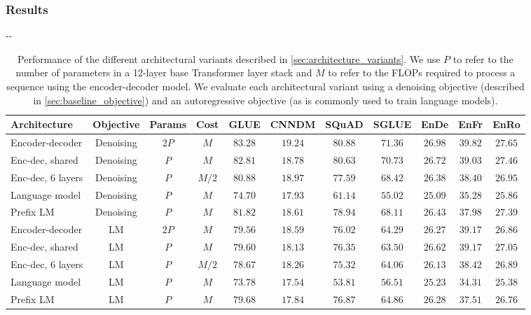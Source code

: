 \documentclass[twoside,11pt]{article}
\newlength{\offsetpage}
\newenvironment{widepage}{\begin{adjustwidth}{-\offsetpage}{-\offsetpage}
    \addtolength{\textwidth}{2\offsetpage}}
{\end{adjustwidth}}
\newcommand{\bsl}{\makebox[0pt][r]{\raisebox{0.05em}{$\bigstar\,$}}}
\def\*#1{\mathbf{#1}}
\begin{document}
\subsubsection{Results}

\begin{table}
\footnotesize
\begin{widepage}
\centering
\begin{tabular}{l c c c c c c c c c c}
\toprule
    Architecture         & Objective & Params & Cost  & GLUE        & CNNDM       & SQuAD       & SGLUE       & EnDe        & EnFr        & EnRo    \\
\midrule
    \bsl Encoder-decoder & Denoising & $2P$   & $M$   & $\*{83.28}$ & $\*{19.24}$ & $\*{80.88}$ & $\*{71.36}$ & $\*{26.98}$ & $\*{39.82}$ & $\*{27.65}$ \\
    Enc-dec, shared      & Denoising & $P$    & $M$   & $82.81$     & $18.78$     & $\*{80.63}$ & $\*{70.73}$ & $26.72$     & $39.03$     & $\*{27.46}$ \\
    Enc-dec, 6 layers    & Denoising & $P$    & $M/2$ & $80.88$     & $18.97$     & $77.59$     & $68.42$     & $26.38$     & $38.40$     & $26.95$ \\
    Language model       & Denoising & $P$    & $M$   & $74.70$     & $17.93$     & $61.14$     & $55.02$     & $25.09$     & $35.28$     & $25.86$ \\
    Prefix LM            & Denoising & $P$    & $M$   & $81.82$     & $18.61$     & $78.94$     & $68.11$     & $26.43$     & $37.98$     & $27.39$ \\
\midrule
    Encoder-decoder      & LM        & $2P$   & $M$   & $79.56$     & $18.59$     & $76.02$     & $64.29$     & $26.27$     & $39.17$     & $26.86$ \\
    Enc-dec, shared      & LM        & $P$    & $M$   & $79.60$     & $18.13$     & $76.35$     & $63.50$     & $26.62$     & $39.17$     & $27.05$ \\
    Enc-dec, 6 layers    & LM        & $P$    & $M/2$ & $78.67$     & $18.26$     & $75.32$     & $64.06$     & $26.13$     & $38.42$     & $26.89$ \\
    Language model       & LM        & $P$    & $M$   & $73.78$     & $17.54$     & $53.81$     & $56.51$     & $25.23$     & $34.31$     & $25.38$ \\
    Prefix LM            & LM        & $P$    & $M$   & $79.68$     & $17.84$     & $76.87$     & $64.86$     & $26.28$     & $37.51$     & $26.76$ \\
\bottomrule
\end{tabular}
\end{widepage}
\caption{
Performance of the different architectural variants described in \cref{sec:architecture_variants}.
We use $P$ to refer to the number of parameters in a 12-layer base Transformer layer stack and $M$ to refer to the FLOPs required to process a sequence using the encoder-decoder model.
We evaluate each architectural variant using a denoising objective (described in \cref{sec:baseline_objective}) and an autoregressive objective (as is commonly used to train language models).
}
\label{tab:architectures_results}

\end{table}
\end{document}
